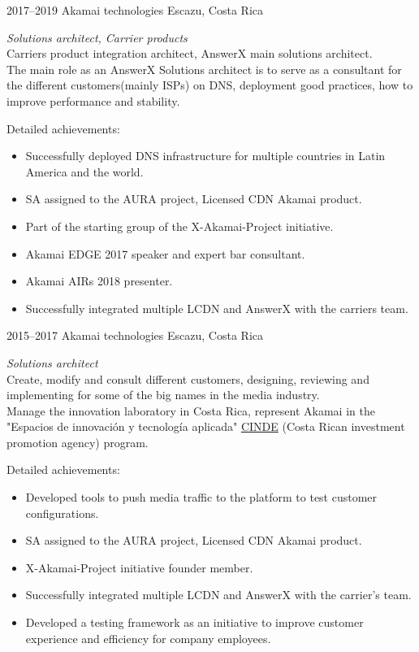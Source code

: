 \documentclass[]{friggeri-cv}
\begin{document}
\begin{entrylist}

\entry
{2017--2019}
{Akamai technologies}
{Escazu, Costa Rica}
{\emph{Solutions architect, Carrier products} \\
Carriers product integration architect, AnswerX main solutions architect.\\
The main role as an AnswerX Solutions architect is to serve as a consultant for the different customers(mainly ISPs) on DNS, deployment good practices, how to improve performance and stability.

Detailed achievements:
\begin{itemize}
        \item Successfully deployed DNS infrastructure for multiple countries in Latin America and the world.
        \item SA assigned to the AURA project, Licensed CDN Akamai product.
        \item Part of the starting group of the X-Akamai-Project initiative.
        \item Akamai EDGE 2017 speaker and expert bar consultant.
        \item Akamai AIRs 2018 presenter.
        \item Successfully integrated multiple LCDN and AnswerX with the carriers team.
\end{itemize}
}

\entry
{2015--2017}
{Akamai technologies}
{Escazu, Costa Rica}
{\emph{Solutions architect} \\
Create, modify and consult different customers, designing, reviewing and implementing for some of the big names in the media industry.\\
Manage the innovation laboratory in Costa Rica, represent Akamai in the "Espacios de innovación y tecnología aplicada" \href{https://www.cinde.org/}{CINDE} (Costa Rican investment promotion agency) program.

Detailed achievements:
\begin{itemize}
	\item Developed tools to push media traffic to the platform to test customer configurations.
	\item SA assigned to the AURA project, Licensed CDN Akamai product.
	\item X-Akamai-Project initiative founder member.
	\item Successfully integrated multiple LCDN and AnswerX with the carrier's team.
	\item Developed a testing framework as an initiative to improve customer experience and efficiency for company employees.
\end{itemize}
}

\end{entrylist}
\end{document}
